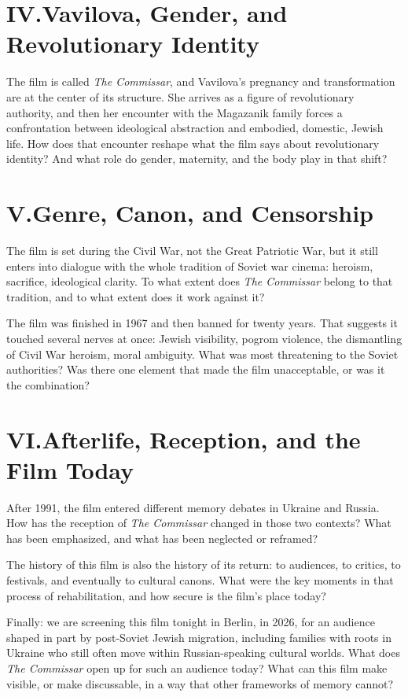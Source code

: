 \documentclass[11pt,a4paper]{article}
\begin{document}
\section*{IV.\quad Vavilova, Gender, and Revolutionary Identity}

The film is called \textit{The Commissar}, and Vavilova's pregnancy and transformation are at the center of its structure. She arrives as a figure of revolutionary authority, and then her encounter with the Magazanik family forces a confrontation between ideological abstraction and embodied, domestic, Jewish life. How does that encounter reshape what the film says about revolutionary identity? And what role do gender, maternity, and the body play in that shift?

\section*{V.\quad Genre, Canon, and Censorship}

The film is set during the Civil War, not the Great Patriotic War, but it still enters into dialogue with the whole tradition of Soviet war cinema: heroism, sacrifice, ideological clarity. To what extent does \textit{The Commissar} belong to that tradition, and to what extent does it work against it?

\medskip

The film was finished in 1967 and then banned for twenty years. That suggests it touched several nerves at once: Jewish visibility, pogrom violence, the dismantling of Civil War heroism, moral ambiguity. What was most threatening to the Soviet authorities? Was there one element that made the film unacceptable, or was it the combination?

\section*{VI.\quad Afterlife, Reception, and the Film Today}

After 1991, the film entered different memory debates in Ukraine and Russia. How has the reception of \textit{The Commissar} changed in those two contexts? What has been emphasized, and what has been neglected or reframed?

\medskip

The history of this film is also the history of its return: to audiences, to critics, to festivals, and eventually to cultural canons. What were the key moments in that process of rehabilitation, and how secure is the film's place today?

\medskip

Finally: we are screening this film tonight in Berlin, in 2026, for an audience shaped in part by post-Soviet Jewish migration, including families with roots in Ukraine who still often move within Russian-speaking cultural worlds. What does \textit{The Commissar} open up for such an audience today? What can this film make visible, or make discussable, in a way that other frameworks of memory cannot?
\end{document}

